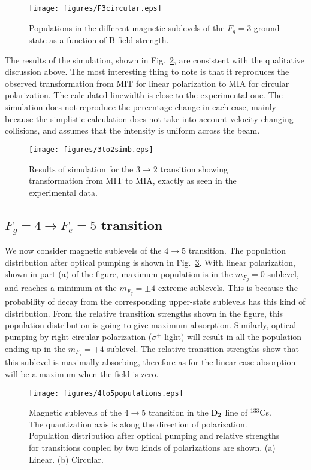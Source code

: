 \begin{figure}
	\centering
	\texttt{[image: figures/F3circular.eps]}
	\caption{Populations in the different magnetic sublevels of the $F_g = 3 $ ground state as a function of B field strength.}
	\label{fig:F3circular}
\end{figure}

The results of the simulation, shown in Fig.\ \ref{fig:3to2sim}, are consistent with the qualitative discussion above. The most interesting thing to note is that it reproduces the observed transformation from MIT for linear polarization to MIA for circular polarization. The calculated linewidth is close to the experimental one. The simulation does not reproduce the percentage change in each case, mainly because the simplistic calculation does not take into account velocity-changing collisions, and assumes that the intensity is uniform across the beam.

\begin{figure}
	\centering
	\texttt{[image: figures/3to2simb.eps]}
	\caption{Results of simulation for the $ 3 \rightarrow 2 $ transition showing transformation from MIT to MIA, exactly as seen in the experimental data.}
	\label{fig:3to2sim}
\end{figure}

\subsection{$ F_g = 4 \rightarrow F_e = 5 $ \rm {transition}}
We now consider magnetic sublevels of the $ 4 \rightarrow 5$ transition. The population distribution after optical pumping is shown in Fig.\ \ref{fig:4to5populations}. With linear polarization, shown in part (a) of the figure, maximum population is in the $ m_{F_g} = 0 $ sublevel, and reaches a minimum at the $ m_{F_g} = \pm 4 $ extreme sublevels. This is because the probability of decay from the corresponding upper-state sublevels has this kind of distribution. From the relative transition strengths shown in the figure, this population distribution is going to give maximum absorption. Similarly, optical pumping by right circular polarization ($ \sigma^+ $ light) will result in all the population ending up in the $ m_{F_g} = +4 $ sublevel. The relative transition strengths show that this sublevel is maximally absorbing, therefore as for the linear case absorption will be a maximum when the field is zero.

\begin{figure}
	\centering
	\texttt{[image: figures/4to5populations.eps]}
	\caption{Magnetic sublevels of the $ 4 \rightarrow 5 $ transition in the $\rm D_2 $ line of $^{133}$Cs. The quantization axis is along the direction of polarization. Population distribution after optical pumping and relative strengths for transitions coupled by two kinds of polarizations are shown. (a) Linear. (b) Circular.}
	\label{fig:4to5populations}
\end{figure}

